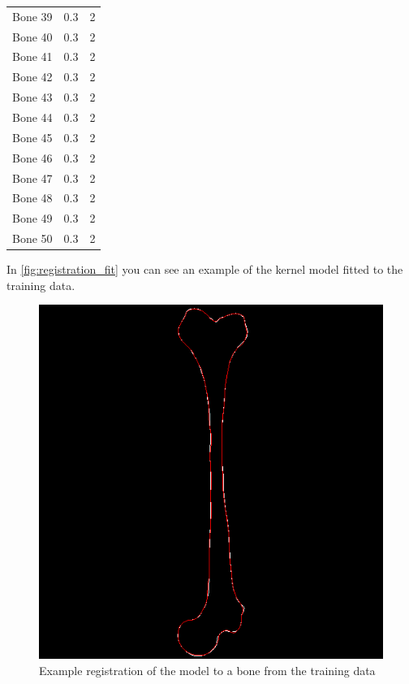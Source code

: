 \begin{table}
\begin{tabular}{lrr}
Bone 39& 0.3 & 2 \\
Bone 40& 0.3 & 2 \\
Bone 41& 0.3 & 2 \\
Bone 42& 0.3 & 2 \\
Bone 43& 0.3 & 2 \\
Bone 44& 0.3 & 2 \\
Bone 45& 0.3 & 2 \\
Bone 46& 0.3 & 2 \\
Bone 47& 0.3 & 2 \\
Bone 48& 0.3 & 2 \\
Bone 49& 0.3 & 2 \\
Bone 50& 0.3 & 2 \\
\bottomrule
\end{tabular}
\end{table}
\fi

In \autoref{fig:registration_fit} you can see an example of the kernel model fitted to the training data.

\begin{figure}
	\centering
  \includegraphics[scale=0.7]{./Figures/registration_fit}
  \caption{Example registration of the model to a bone from the training data}
  \label{fig:registration_fit}
\end{figure}

